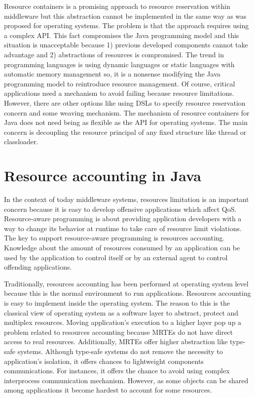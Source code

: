 Resource containers is a promising approach to resource reservation within middleware but this abstraction cannot be implemented in the same way as was proposed for operating systems. The problem is that the approach requires using a complex API. This fact compromises the Java programming model and this situation is unacceptable because 1) previous developed components cannot take advantage and 2) abstractions of resources is compromised. The trend in programming languages is using dynamic languages or static languages with automatic memory management so, it is a nonsense modifying the Java programming model to reintroduce resource management. Of course, critical applications need a mechanism to avoid failing because resource limitations. However, there are other options like using DSLs to specify resource reservation concern and some weaving mechanism. The mechanism of resource containers for Java does not need being as flexible as the API for operating systems. The main concern is decoupling the resource principal of any fixed structure like thread or classloader.

\section{Resource accounting in Java}
In the context of today middleware systems, resources limitation is an important concern because it is easy to develop offensive applications which affect QoS. Resource-aware programming is about providing application developers with a way to change its behavior at runtime to take care of resource limit violations. The key to support resource-aware programming is resources accounting. Knowledge about the amount of resources consumed by an application can be used by the application to control itself or by an external agent to control offending applications.

Traditionally, resources accounting has been performed at operating system level because this is the normal environment to run applications. Resources accounting is easy to implement inside the operating system. The reason to this is the classical view of operating system as a software layer to abstract, protect and multiplex resources. Moving application's execution to a higher layer pop up a problem related to resources accounting because MRTEs do not have direct access to real resources. Additionally, MRTEs offer higher abstraction like type-safe systems. Although type-safe systems do not remove the necessity to application's isolation, it offers chances to lightweight components communications. For instances, it offers the chance to avoid using complex interprocess communication mechanism. However, as some objects can be shared among applications it become hardest to account for some resources.

